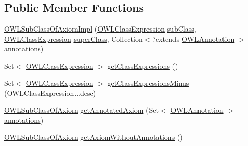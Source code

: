 \subsection*{Public Member Functions}
\begin{DoxyCompactItemize}
\item 
\hyperlink{classuk_1_1ac_1_1manchester_1_1cs_1_1owl_1_1owlapi_1_1_o_w_l_sub_class_of_axiom_impl_aff581c5cb327f2204a2a02702adb7d99}{O\-W\-L\-Sub\-Class\-Of\-Axiom\-Impl} (\hyperlink{interfaceorg_1_1semanticweb_1_1owlapi_1_1model_1_1_o_w_l_class_expression}{O\-W\-L\-Class\-Expression} \hyperlink{classuk_1_1ac_1_1manchester_1_1cs_1_1owl_1_1owlapi_1_1_o_w_l_sub_class_of_axiom_impl_ada3c83d9b2659089fe9fa76ae4f02618}{sub\-Class}, \hyperlink{interfaceorg_1_1semanticweb_1_1owlapi_1_1model_1_1_o_w_l_class_expression}{O\-W\-L\-Class\-Expression} \hyperlink{classuk_1_1ac_1_1manchester_1_1cs_1_1owl_1_1owlapi_1_1_o_w_l_sub_class_of_axiom_impl_a84b65e43d23b9f6b6932e828bf45a0bb}{super\-Class}, Collection$<$?extends \hyperlink{interfaceorg_1_1semanticweb_1_1owlapi_1_1model_1_1_o_w_l_annotation}{O\-W\-L\-Annotation} $>$ \hyperlink{classuk_1_1ac_1_1manchester_1_1cs_1_1owl_1_1owlapi_1_1_o_w_l_axiom_impl_af6fbf6188f7bdcdc6bef5766feed695e}{annotations})
\item 
Set$<$ \hyperlink{interfaceorg_1_1semanticweb_1_1owlapi_1_1model_1_1_o_w_l_class_expression}{O\-W\-L\-Class\-Expression} $>$ \hyperlink{classuk_1_1ac_1_1manchester_1_1cs_1_1owl_1_1owlapi_1_1_o_w_l_sub_class_of_axiom_impl_ac6b3aa3446c1d0fc91a613667397218c}{get\-Class\-Expressions} ()
\item 
Set$<$ \hyperlink{interfaceorg_1_1semanticweb_1_1owlapi_1_1model_1_1_o_w_l_class_expression}{O\-W\-L\-Class\-Expression} $>$ \hyperlink{classuk_1_1ac_1_1manchester_1_1cs_1_1owl_1_1owlapi_1_1_o_w_l_sub_class_of_axiom_impl_ace2b56ea802935ceb8547714a0f32625}{get\-Class\-Expressions\-Minus} (O\-W\-L\-Class\-Expression...\-desc)
\item 
\hyperlink{interfaceorg_1_1semanticweb_1_1owlapi_1_1model_1_1_o_w_l_sub_class_of_axiom}{O\-W\-L\-Sub\-Class\-Of\-Axiom} \hyperlink{classuk_1_1ac_1_1manchester_1_1cs_1_1owl_1_1owlapi_1_1_o_w_l_sub_class_of_axiom_impl_a8ff34c2fcf3f63b1e5ac009108c28fbf}{get\-Annotated\-Axiom} (Set$<$ \hyperlink{interfaceorg_1_1semanticweb_1_1owlapi_1_1model_1_1_o_w_l_annotation}{O\-W\-L\-Annotation} $>$ \hyperlink{classuk_1_1ac_1_1manchester_1_1cs_1_1owl_1_1owlapi_1_1_o_w_l_axiom_impl_af6fbf6188f7bdcdc6bef5766feed695e}{annotations})
\item 
\hyperlink{interfaceorg_1_1semanticweb_1_1owlapi_1_1model_1_1_o_w_l_sub_class_of_axiom}{O\-W\-L\-Sub\-Class\-Of\-Axiom} \hyperlink{classuk_1_1ac_1_1manchester_1_1cs_1_1owl_1_1owlapi_1_1_o_w_l_sub_class_of_axiom_impl_ae11418ad91b4f12d5f5707bc6e9e67b4}{get\-Axiom\-Without\-Annotations} ()

\end{DoxyCompactItemize}
